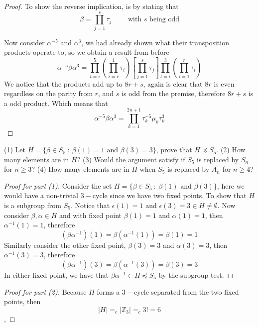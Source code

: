\begin{assignment}[
  header=HeaderA,
  body=BodyA,
  title={Homework 3},
  duedate={26 February, 2026},
  toc=false,
  toctitle={This appears on the Table of contents.},
  exlist=false
]
\begin{exer}[Problem 5.19]
\begin{proof}
To show the reverse implication, is by stating that
\[
\beta = \prod_{j=1}^{s} \tau_j \quad \quad \text{ with } s \text{ being odd}
\]

Now consider $\alpha^{-5}$ and $\alpha^{3}$, we had already shown what their transposition products operate to, so we obtain a result from before
\[
\alpha^{-5}\beta\alpha^3 = \prod_{t=i}^{5}\left(\prod_{i=r}^1 \tau_i\right) \left[ \prod_{j=1}^s \tau_j \right] \prod_{t=i}^{3}\left(\prod_{i=1}^r \tau_i\right)
\]
We notice that the products add up to $8r + s$, again is clear that $8r$ is even regardless on the parity from $r$, and $s$ is odd from the premise, therefore $8r + s$ is a odd product. Which means that
\[
\alpha^{-5}\beta\alpha^3 = \prod_{k=1}^{2n+1} \tau_k^{-5}\mu_k\tau_k^{3}
\]


\end{proof}
\end{exer}

\begin{exer}[Problem 5.44]
(1) Let $H = \{\beta \in S_5 \ : \ \beta(1) = 1 \text{ and } \beta(3) = 3\}$, prove that $H \preccurlyeq S_5$. (2) How many elements are in $H$?  (3) Would the argument satisfy if $S_5$ is replaced by $S_n$ for $n \geq 3$?  (4) How many elements are in $H$ when $S_5$ is replaced by $A_n$ for $n \geq 4$?
\begin{proof}[Proof for part (1)]
Consider the set $H = \{\beta \in S_5 \ : \ \beta(1) \text{ and } \beta(3) \}$, here we would have a non-trivial $3-$cycle since we have two fixed points. To show that $H$ is a subgroup from $S_5$. Notice that $\epsilon(1) = 1 \text{ and } \epsilon(3) = 3 \in H \neq \emptyset$. Now consider $\beta, \alpha \in H$ and with fixed point $\beta(1) = 1$ and $\alpha(1) = 1$, then $\alpha^{-1}(1) = 1$, therefore
\[
(\beta\alpha^{-1})(1) = \beta(\alpha^{-1}(1)) = \beta(1) = 1 
\]
Similarly consider the other fixed point, $\beta(3) = 3$ and $\alpha(3) = 3$, then $\alpha^{-1}(3) = 3$, therefore
\[
(\beta\alpha^{-1})(3)=\beta(\alpha^{-1}(3)) = \beta(3) = 3 
\]
In either fixed point, we have that $\beta\alpha^{-1} \in H \preccurlyeq S_5$ by the subgroup test.
\end{proof}
\begin{proof}[Proof for part (2)]
Because $H$ forms a $3-$cycle separated from the two fixed points, then \[|H| =_c |\mathbb{Z}_3| =_c 3! = 6\], 
     

\end{proof}
\end{exer}
\end{assignment}
